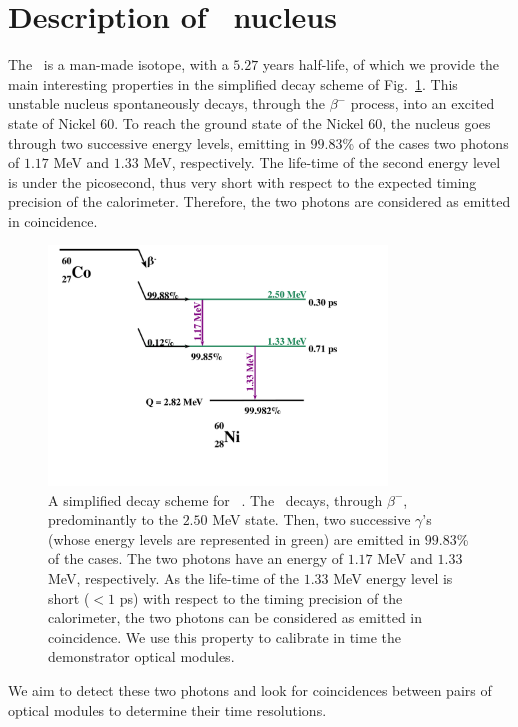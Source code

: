 \section{Description of \Co\ nucleus}
\label{subsec:CoSource}
The \Co\ is a man-made isotope, with a $5.27$ years half-life, of which we provide the main interesting properties in the simplified decay scheme of Fig.~\ref{fig:Co_decay_scheme}.
This unstable nucleus spontaneously decays, through the $\beta^{-}$ process, into an excited state of Nickel $60$.
To reach the ground state of the Nickel $60$, the nucleus goes through two successive energy levels, emitting in $99.83$\% of the cases two photons of $1.17$ MeV and $1.33$ MeV, respectively.
The life-time of the second energy level is under the picosecond, thus very short with respect to the expected timing precision of the calorimeter.
Therefore, the two photons are considered as emitted in coincidence.
\begin{figure}[h]
  \centering
  \includegraphics[width=9cm]{commissioning/fig_commissioning/Co_decay_scheme.pdf}
  \caption{A simplified decay scheme for \Co~\cite{web:nucleide}.
    The \Co\ decays, through $\beta^{-}$, predominantly to the $2.50$ MeV state.
    Then, two successive $\gamma$'s (whose energy levels are represented in green) are emitted in $99.83$\% of the cases.
    The two photons have an energy of $1.17$ MeV and $1.33$ MeV, respectively.
    As the life-time of the $1.33$ MeV energy level is short ($<1$ ps) with respect to the timing precision of the calorimeter, the two photons can be considered as emitted in coincidence.
    We use this property to calibrate in time the demonstrator optical modules.
    \label{fig:Co_decay_scheme}}
\end{figure}

We aim to detect these two photons and look for coincidences between pairs of optical modules to determine their time resolutions.


